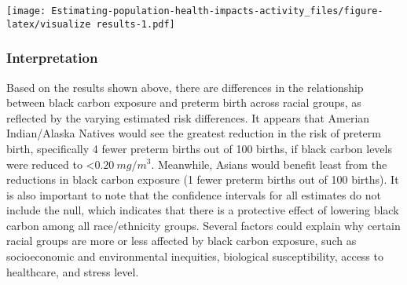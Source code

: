 \documentclass[
]{article}
\begin{document}
\texttt{[image: Estimating-population-health-impacts-activity\_files/figure-latex/visualize results-1.pdf]}

\subsubsection{Interpretation}\label{interpretation-1}

Based on the results shown above, there are differences in the
relationship between black carbon exposure and preterm birth across
racial groups, as reflected by the varying estimated risk differences.
It appears that Amerian Indian/Alaska Natives would see the greatest
reduction in the risk of preterm birth, specifically 4 fewer preterm
births out of 100 births, if black carbon levels were reduced to
\textless{}\(0.20 \ mg/m^3\). Meanwhile, Asians would benefit least from
the reductions in black carbon exposure (1 fewer preterm births out of
100 births). It is also important to note that the confidence intervals
for all estimates do not include the null, which indicates that there is
a protective effect of lowering black carbon among all race/ethnicity
groups. Several factors could explain why certain racial groups are more
or less affected by black carbon exposure, such as socioeconomic and
environmental inequities, biological susceptibility, access to
healthcare, and stress level.
\end{document}
